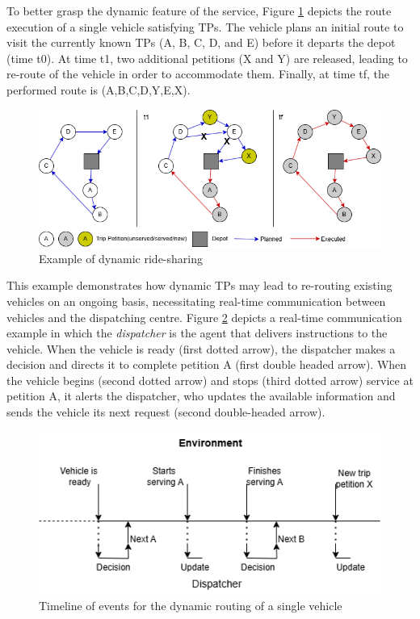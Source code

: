 To better grasp the dynamic feature of the service, Figure \ref{fig:dynamic_rs_illus} depicts the route execution of a single vehicle satisfying TPs. The vehicle plans an initial route to visit the currently known TPs (A, B, C, D, and E) before it departs the depot (time t0). At time t1, two additional petitions (X and Y) are released, leading to re-route of the vehicle in order to accommodate them. Finally, at time tf, the performed route is (A,B,C,D,Y,E,X).
\begin{figure}[htbp]
    \centering
    \includegraphics[scale=0.6]{Crest/Images/dynamic_ride_sharing_example.png}
    \caption{Example of dynamic ride-sharing}
    \label{fig:dynamic_rs_illus}
\end{figure}
This example demonstrates how dynamic TPs may lead to re-routing existing vehicles on an ongoing basis, necessitating real-time communication between vehicles and the dispatching centre. Figure \ref{fig:dynamic_routing} depicts a real-time communication example in which the \textit{dispatcher} is the agent that delivers instructions to the vehicle. When the vehicle is ready (first dotted arrow), the dispatcher makes a decision and directs it to complete petition A (first double headed arrow). When the vehicle begins (second dotted arrow) and stops (third dotted arrow) service at petition A, it alerts the dispatcher, who updates the available information and sends the vehicle its next request (second double-headed arrow).
\begin{figure}[htbp]
    \centering
    \includegraphics[scale=0.6]{Crest/Images/timeline_events.png}
    \caption{Timeline of events for the dynamic routing of a single vehicle}
    \label{fig:dynamic_routing}
\end{figure}

